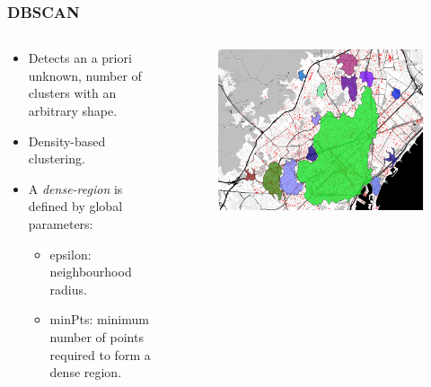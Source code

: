 \documentclass[hyperref={pdfpagelabels=true}]{beamer}
\begin{document}
\begin{frame}
\frametitle{DBSCAN}
\begin{columns}
  \begin{column}{0.5\textwidth}\small{ 
    \begin{itemize}    
	  \item<2->Detects an a priori unknown, number of clusters with an arbitrary shape. %
	  \item<3->Density-based clustering.%
	  \item<4->A \textit{dense-region} is defined by global parameters: 
	  \begin{itemize}
	    \item<5->epsilon: neighbourhood radius.
	    \item<5->minPts: minimum number of points required to form a dense region.
	  \end{itemize}                
    \end{itemize}              }  
  \end{column}
  \begin{column}{0.5\textwidth}    
      \begin{figure}   
	\includegraphics[width=\textwidth]{elki_dbscan_003_250.png}   
      \end{figure}     
  \end{column}  
\end{columns}
\end{frame}

\end{document}
